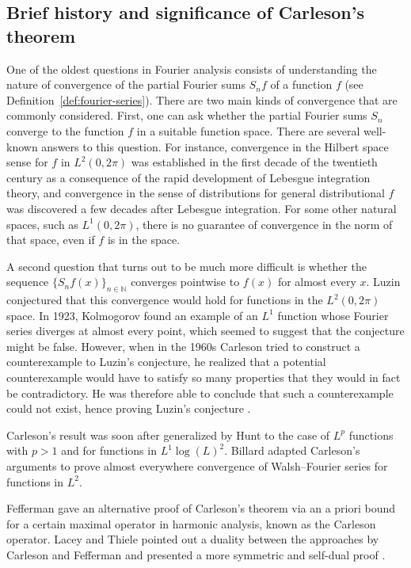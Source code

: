 \documentclass[12pt, reqno]{amsart}
\newcommand*{\nat}{\mathbb{N}} %
\theoremstyle{definition}
\theoremstyle{plain}
\begin{document}
\subsection{Brief history and significance of Carleson's theorem}\label{subsec:history}

One of the oldest questions in Fourier analysis consists of understanding the nature of convergence of the partial Fourier sums $S_n f$ of a function $f$ (see Definition~\ref{def:fourier-series}).
There are two main kinds of convergence that are commonly considered. First, one can ask whether the partial Fourier sums $S_n$ converge to the function $f$ in a suitable function
space. There are several well-known answers to this question. For instance, convergence in the Hilbert
space sense for $f$ in $L^2(0,2\pi)$ was established in the first decade of
the twentieth century as a consequence of the rapid development of Lebesgue
integration theory, and convergence in the sense of
distributions for general distributional $f$ was discovered a few decades
after Lebesgue integration. For some other natural spaces, such as
$L^1(0,2\pi)$, there is no guarantee of convergence in the norm of that space,
even if $f$ is in the space.

A second question that turns out to be much more difficult is whether the sequence $\{S_n f(x)\}_{n\in\nat}$ converges pointwise to $f(x)$ for almost every $x$.
Luzin \cite{Luzin13} conjectured that this convergence would hold for functions in the
$L^2(0,2\pi)$ space. In 1923, Kolmogorov found an example \cite{Kolmogorov} of an $L^1$ function whose Fourier series diverges at almost every point, which seemed to suggest that the conjecture might be false. However, when in the 1960s Carleson tried to construct a counterexample to Luzin's conjecture, he realized that a potential counterexample would have to satisfy so many properties that they would in fact be contradictory. He was therefore able to conclude that such a counterexample could not exist, hence proving Luzin's conjecture \cite{carleson}.

Carleson's result was soon after generalized by Hunt \cite{MR238019} to the case of $L^p$ functions with $p>1$ and for functions in $L^1\log(L)^2$. Billard \cite{MR217510} adapted Carleson's arguments to prove almost everywhere convergence of Walsh--Fourier series
for functions in $L^2$.

Fefferman gave an alternative proof of Carleson's theorem \cite{fefferman} via an a priori bound for a certain maximal operator in harmonic analysis, known as the Carleson operator.
Lacey and Thiele pointed out a duality between the approaches by Carleson and Fefferman and presented a more symmetric and self-dual proof \cite{lacey-thiele}.
\end{document}

